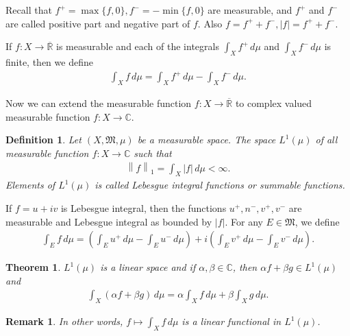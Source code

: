 \documentclass[11pt]{book}
\newtheorem{definition}{Definition}[chapter]
\newtheorem{theorem}{Theorem}[chapter]
\newtheorem{remark}{Remark}[chapter]
\theoremstyle{definition}
\numberwithin{equation}{chapter}
\begin{document}
\medskip

Recall that $f^+ = \max\{f,0\}, f^- = - \min\{f,0\}$ are measurable, and $f^+$ and $f^-$ are called positive part and negative part of $f$. Also $f = f^+ + f^-, \left|f\right| = f^+ + f^-$.

If $f: X \to \overline{\mathbb{R}}$ is measurable and each of the integrals $\int_X f^+\,d\mu$ and $\int_X f^-\,d\mu$ is finite, then we define
\begin{align*}
    \int_X f\,d\mu = \int_X f^+\,d\mu - \int_X f^-\,d\mu.
\end{align*}

\medskip

Now we can extend the measurable function $f:X \to \overline{\mathbb{R}}$ to complex valued measurable function $f: X \to \mathbb{C}$.

\medskip

\begin{definition}
Let $(X,\mathfrak{M},\mu)$ be a measurable space. The space $L^1(\mu)$ of all measurable function $f: X \to \mathbb{C}$ such that
\begin{align*}
    \left\|f\right\|_1 = \int_X \left|f\right|\,d\mu < \infty.
\end{align*}
Elements of $L^1(\mu)$ is called Lebesgue integral functions or summable functions.
\end{definition}

\medskip

If $f = u + iv$ is Lebesgue integral, then the functions $u^+, n^-, v^+, v^-$ are measurable and Lebesgue integral as bounded by $\left|f\right|$. For any $E \in \mathfrak{M}$, we define
\begin{align*}
    \int_E f\,d\mu = \left(\int_E u^+\,d\mu - \int_E u^-\,d\mu\right) + i \left(\int_E v^+\,d\mu - \int_E v^-\,d\mu\right).
\end{align*}

\medskip

\begin{theorem}
$L^1(\mu)$ is a linear space and if $\alpha,\beta \in \mathbb{C}$, then $\alpha f + \beta g \in L^1(\mu)$ and
\begin{align*}
    \int_X (\alpha f + \beta g)\,d\mu = \alpha \int_X f\,d\mu + \beta \int_X g\,d\mu.
\end{align*}
\end{theorem}

\medskip

\begin{remark}
In other words, $f \mapsto \int_X f\,d\mu$ is a linear functional in $L^1(\mu)$.
\end{remark}
\end{document}
